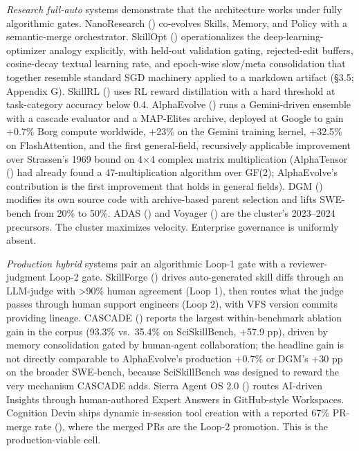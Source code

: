 \documentclass[
]{article}
\begin{document}
\emph{Research full-auto} systems demonstrate that the architecture
works under fully algorithmic gates. NanoResearch
() co-evolves
Skills, Memory, and Policy with a semantic-merge orchestrator. SkillOpt
() operationalizes
the deep-learning-optimizer analogy explicitly, with held-out validation
gating, rejected-edit buffers, cosine-decay textual learning rate, and
epoch-wise slow/meta consolidation that together resemble standard SGD
machinery applied to a markdown artifact (§3.5; Appendix G). SkillRL
() uses RL reward
distillation with a hard threshold at task-category accuracy below 0.4.
AlphaEvolve () runs
a Gemini-driven ensemble with a cascade evaluator and a MAP-Elites
archive, deployed at Google to gain +0.7\% Borg compute worldwide, +23\%
on the Gemini training kernel, +32.5\% on FlashAttention, and the first
general-field, recursively applicable improvement over Strassen's 1969
bound on 4×4 complex matrix multiplication (AlphaTensor
() had already
found a 47-multiplication algorithm over GF(2); AlphaEvolve's
contribution is the first improvement that holds in general fields). DGM
() modifies its
own source code with archive-based parent selection and lifts SWE-bench
from 20\% to 50\%. ADAS () and
Voyager () are the
cluster's 2023--2024 precursors. The cluster maximizes velocity.
Enterprise governance is uniformly absent.

\emph{Production hybrid} systems pair an algorithmic Loop-1 gate with a
reviewer-judgment Loop-2 gate. SkillForge
() drives
auto-generated skill diffs through an LLM-judge with \textgreater90\%
human agreement (Loop 1), then routes what the judge passes through
human support engineers (Loop 2), with VFS version commits providing
lineage. CASCADE ()
reports the largest within-benchmark ablation gain in the corpus (93.3\%
vs.~35.4\% on SciSkillBench, +57.9 pp), driven by memory consolidation
gated by human-agent collaboration; the headline gain is not directly
comparable to AlphaEvolve's production +0.7\% or DGM's +30 pp on the
broader SWE-bench, because SciSkillBench was designed to reward the very
mechanism CASCADE adds. Sierra Agent OS 2.0
() routes AI-driven Insights
through human-authored Expert Answers in GitHub-style Workspaces.
Cognition Devin ships dynamic in-session tool creation with a reported
67\% PR-merge rate (), where the merged PRs are the Loop-2 promotion. This is the
production-viable cell.
\end{document}
